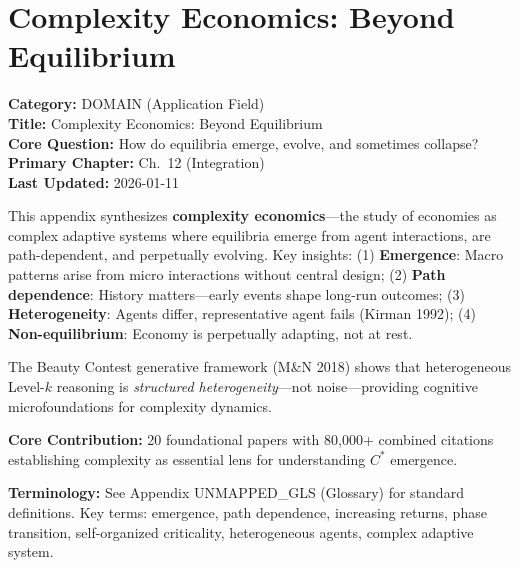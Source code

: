 \section{Complexity Economics: Beyond Equilibrium}
\label{app:complexity-economics}


\begin{tcolorbox}[colback=gray!5!white, colframe=gray!75!black,
    title=\textbf{Appendix: AG DOMAIN-COMPLEXITY}]
\textbf{Category:} DOMAIN (Application Field) \\
\textbf{Title:} Complexity Economics: Beyond Equilibrium \\
\textbf{Core Question:} How do equilibria emerge, evolve, and sometimes collapse? \\
\textbf{Primary Chapter:} Ch.\ 12 (Integration) \\
\textbf{Last Updated:} 2026-01-11
\end{tcolorbox}

\begin{tcolorbox}[colback=blue!5!white, colframe=blue!75!black,
    title=\textbf{Abstract}]

This appendix synthesizes \textbf{complexity economics}---the study of economies
as complex adaptive systems where equilibria emerge from agent interactions,
are path-dependent, and perpetually evolving. Key insights:
(1) \textbf{Emergence}: Macro patterns arise from micro interactions without central design;
(2) \textbf{Path dependence}: History matters---early events shape long-run outcomes;
(3) \textbf{Heterogeneity}: Agents differ, representative agent fails (Kirman 1992);
(4) \textbf{Non-equilibrium}: Economy is perpetually adapting, not at rest.

The Beauty Contest generative framework (M\&N 2018) shows that heterogeneous
Level-$k$ reasoning is \textit{structured heterogeneity}---not noise---providing
cognitive microfoundations for complexity dynamics.

\textbf{Core Contribution:} 20 foundational papers with 80,000+ combined citations
establishing complexity as essential lens for understanding $C^*$ emergence.

\end{tcolorbox}

\begin{tcolorbox}[colback=gray!5!white, colframe=gray!50!black]
\textbf{Terminology:} See Appendix UNMAPPED_GLS (Glossary) for standard definitions.
Key terms: emergence, path dependence, increasing returns, phase transition,
self-organized criticality, heterogeneous agents, complex adaptive system.
\end{tcolorbox}


